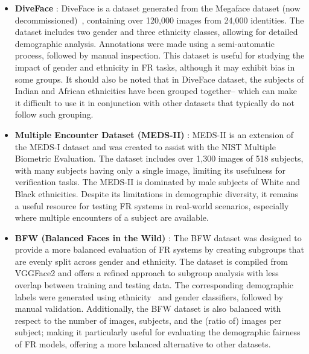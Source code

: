 \begin{itemize}
\item \textbf{DiveFace} \cite{morales2020sensitivenets}:
DiveFace is a dataset generated from the Megaface dataset (now
decommissioned)~\cite{kemelmacher2016megaface}, containing over 120,000 images
from 24,000 identities. The dataset includes two gender and three ethnicity
classes, allowing for detailed demographic analysis. Annotations were made using
a semi-automatic process, followed by manual inspection. This dataset is useful for
studying the impact of gender and ethnicity in FR tasks, although it may exhibit
bias in some groups. It should also be noted that in DiveFace dataset, the
subjects of Indian and African ethnicities have been grouped together-- which
can make it difficult to use it in conjunction with other datasets that
typically do not follow such grouping.

\item \textbf{Multiple Encounter Dataset (MEDS-II)} \cite{founds2011nist}:
MEDS-II is an extension of the MEDS-I dataset and was created to assist with the
NIST Multiple Biometric Evaluation. The dataset includes over 1,300 images of
518 subjects, with many subjects having only a single image, limiting its
usefulness for verification tasks. The MEDS-II is dominated by male subjects of
White and Black ethnicities. Despite its limitations in demographic diversity,
it remains a useful resource for testing FR systems in real-world scenarios,
especially where multiple encounters of a subject are available.

        
\item \textbf{BFW (Balanced Faces in the Wild)} \cite{robinson2023balancing} \cite{robinson2020face}:
The BFW dataset was designed to provide a more balanced evaluation of FR systems
by creating subgroups that are evenly split across gender and ethnicity. The
dataset is compiled from VGGFace2 \cite{cao2018vggface2} and offers a refined
approach to subgroup analysis with less overlap between training and testing
data. The corresponding demographic labels were generated using
ethnicity~\cite{fu2014learning} and gender \cite{levi2015age} classifiers,
followed by manual validation.  Additionally, the BFW dataset is also balanced
with respect to the number of images, subjects, and the (ratio of) images per
subject; making it particularly useful for evaluating the demographic fairness
of FR models, offering a more balanced alternative to other datasets. 



\end{itemize}
